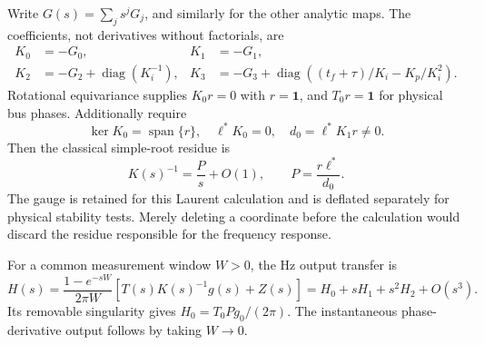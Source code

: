 \documentclass[11pt]{article}
\newcommand{\diag}{\operatorname{diag}}
\newcommand{\one}{\mathbf{1}}
\begin{document}
Write $G(s)=\sum_j s^jG_j$, and similarly for the other analytic maps.
The coefficients, not derivatives without factorials, are
\begin{align}
 K_0&=-G_0,& K_1&=-G_1,\\
 K_2&=-G_2+\diag(K_i^{-1}),&
 K_3&=-G_3+\diag\!\left((t_f+\tau)/K_i-K_p/K_i^2\right).
 \label{eq:momentKcoeff}
\end{align}
Rotational equivariance supplies $K_0r=0$ with $r=\one$, and $T_0r=\one$
for physical bus phases. Additionally require
\[
 \ker K_0=\operatorname{span}\{r\},\quad
 \ell^*K_0=0,\quad d_0=\ell^*K_1r\ne0.
\]
Then the classical simple-root residue is
\begin{equation}
 K(s)^{-1}=\frac{P}{s}+O(1),\qquad
 P=\frac{r\ell^*}{d_0}.
 \label{eq:momentresidue}
\end{equation}
The gauge is retained for this Laurent calculation and is deflated separately
for physical stability tests. Merely deleting a coordinate before the
calculation would discard the residue responsible for the frequency response.

For a common measurement window $W>0$, the Hz output transfer is
\begin{equation}
 H(s)=\frac{1-e^{-sW}}{2\pi W}
 \left[T(s)K(s)^{-1}g(s)+Z(s)\right]
      =H_0+sH_1+s^2H_2+O(s^3).
 \label{eq:momentfreq}
\end{equation}
Its removable singularity gives $H_0=T_0Pg_0/(2\pi)$. The instantaneous
phase-derivative output follows by taking $W\to0$.
\end{document}
